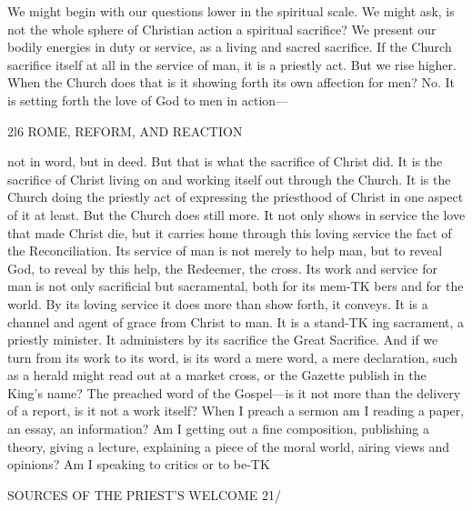 \documentclass[12pt,a5paper,oneside]{book}
\begin{document}
{{We might begin with our questions lower in the 
spiritual scale. We might ask, is not the whole 
sphere of Christian action a spiritual sacrifice? We 
present our bodily energies in duty or service, as a 
living and sacred sacrifice. If the Church sacrifice 
itself at all in the service of man, it is a priestly act. 
But we rise higher. When the Church does that 
is it showing forth its own affection for men? No. 
It is setting forth the love of God to men in action---



2l6 ROME, REFORM, AND REACTION 

not in word, but in deed. But that is what the 
sacrifice of Christ did. It is the sacrifice of Christ 
living on and working itself out through the Church. 
It is the Church doing the priestly act of expressing 
the priesthood of Christ in one aspect of it at least. 
But the Church does still more. It not only shows 
in service the love that made Christ die, but it carries 
home through this loving service the fact of the 
Reconciliation. Its service of man is not merely to 
help man, but to reveal God, to reveal by this help, the 
Redeemer, the cross. Its work and service for man is 
not only sacrificial but sacramental, both for its mem-TK
bers and for the world. By its loving service it does 
more than show forth, it conveys. It is a channel 
and agent of grace from Christ to man. It is a stand-TK
ing sacrament, a priestly minister. It administers by 
its sacrifice the Great Sacrifice. And if we turn from 
its work to its word, is its word a mere word, a mere 
declaration, such as a herald might read out at a market 
cross, or the Gazette publish in the King's name? 
The preached word of the Gospel---is it not more 
than the delivery of a report, is it not a work itself? 
When I preach a sermon am I reading a paper, an 
essay, an information? Am I getting out a fine 
composition, publishing a theory, giving a lecture, 
explaining a piece of the moral world, airing views 
and opinions? Am I speaking to critics or to be-TK



SOURCES OF THE PRIEST'S WELCOME 21/ 

}}
\end{document}
